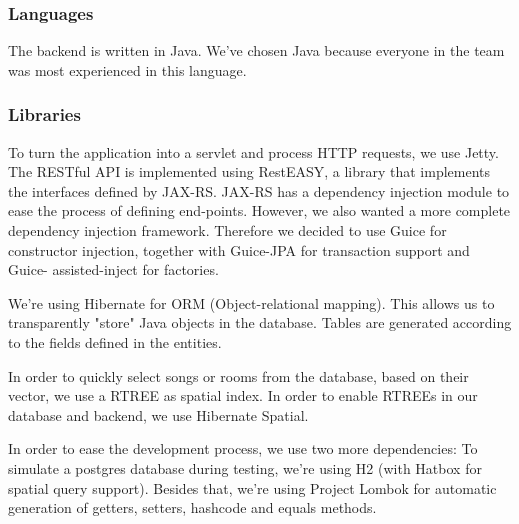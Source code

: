 \subsubsection{Languages}
The backend is written in Java.
We've chosen Java because everyone in the team was most experienced in this language.

\subsubsection{Libraries}
To turn the application into a servlet and process HTTP requests, we use Jetty.
The RESTful API is implemented using RestEASY, a library that implements the interfaces defined by JAX-RS.
JAX-RS has a dependency injection module to ease the process of defining end-points.
However, we also wanted a more complete dependency injection framework.
Therefore we decided to use Guice for constructor injection, together with Guice-JPA for transaction support and Guice- assisted-inject for factories.

We're using Hibernate for ORM (Object-relational mapping).
This allows us to transparently "store" Java objects in the database.
Tables are generated according to the fields defined in the entities.

In order to quickly select songs or rooms from the database, based on their vector, we use a RTREE as spatial index.
In order to enable RTREEs in our database and backend, we use Hibernate Spatial.

In order to ease the development process, we use two more dependencies:
To simulate a postgres database during testing, we're using H2 (with Hatbox for spatial query support).
Besides that, we're using Project Lombok for automatic generation of getters, setters, hashcode and equals methods.
